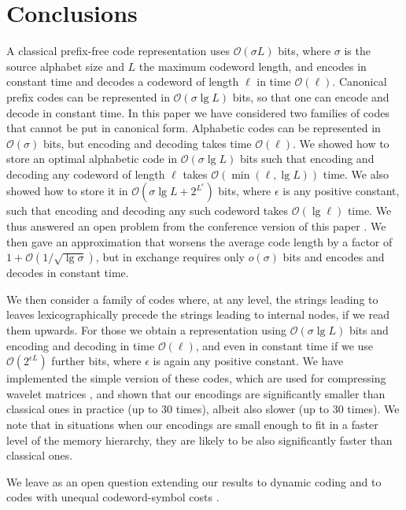 \documentclass[preprint,12pt]{elsarticle}
\newcommand{\Oh}[1]{\ensuremath{\mathcal{O}\!\left({#1}\right)}}
\renewcommand{\log}{\lg}
\begin{document}
\section{Conclusions}

A classical prefix-free code representation uses $\Oh{\sigma L}$ bits, where
$\sigma$ is the source alphabet size and $L$ the maximum codeword length, and
encodes in constant time and decodes a codeword of length $\ell$ in time
$\Oh{\ell}$.
Canonical prefix codes can be represented in $\Oh{\sigma \log L}$ bits, so that
one can encode and decode in constant time. In this paper we have considered
two families of codes that cannot be put in canonical form. Alphabetic codes
can be represented in $\Oh{\sigma}$ bits, but encoding and decoding
takes time $\Oh{\ell}$. We showed how to store an optimal alphabetic code in $\Oh{\sigma \log L}$ bits such that encoding and decoding any codeword of length $\ell$ takes $\Oh{\min (\ell, \log L)}$ time. We also showed how to store it in $\Oh{\sigma \log L + 2^{L^\epsilon}}$ bits, 
where $\epsilon$ is any positive constant, such that encoding and decoding any such codeword takes $\Oh{\log \ell}$ time.  We thus answered an open problem from the conference version of this paper \cite{SPIRE16}.  We then gave an approximation that worsens the average code
length by a factor of $1+\Oh{1/\sqrt{\log\sigma}}$, but in exchange
requires only $o(\sigma)$ bits and encodes and decodes in constant time. 

We then consider a family of codes where, at any level, the strings leading to 
leaves lexicographically precede the strings leading to internal nodes, if we 
read them upwards.
For those we obtain a representation using $\Oh{\sigma\log L}$ bits and encoding
and decoding in time $\Oh{\ell}$, and even in constant time 
if we use $\Oh{2^{\epsilon L}}$ further bits, where $\epsilon$ is again any positive constant.  We have implemented the simple version of these codes, which
are used for compressing wavelet matrices \cite{CNO15}, and shown that our encodings are
significantly smaller than classical ones in practice (up to 30 times),
albeit also slower (up to 30 times).
We note that in situations when our encodings are small enough to fit in a faster level of the memory hierarchy, they are likely to be also significantly faster than classical ones.

We leave as an open question extending our results to dynamic coding
\cite{Gag04,GKN09,GN09,GN11,GILMN18} and to codes with unequal codeword-symbol
costs \cite{GN09,GL08}. 
\end{document}

